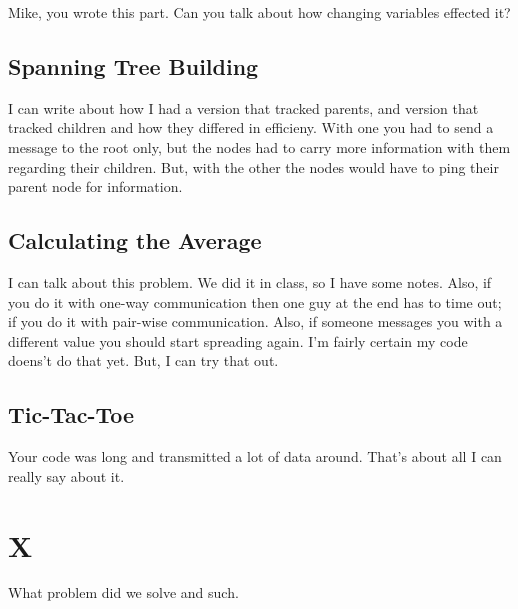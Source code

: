 \documentclass[11pt,twocolumn]{article}
\begin{document}
Mike, you wrote this part.  Can you talk about how changing variables effected
it?

\subsection{Spanning Tree Building}

I can write about how I had a version that tracked parents, and version that 
tracked children and how they differed in efficieny.  With one you had to
send a message to the root only, but the nodes had to carry more information
with them regarding their children.  But, with the other the nodes would have
to ping their parent node for information.

\subsection{Calculating the Average}

I can talk about this problem.  We did it in class, so I have some notes.  Also,
if you do it with one-way communication then one guy at the end has to time out;
if you do it with pair-wise communication.  Also, if someone messages you with
 a different value you should start spreading again.  I'm fairly certain my 
code doens't do that yet.  But, I can try that out.

\subsection{Tic-Tac-Toe}

Your code was long and transmitted a lot of data around.  That's about all I can
 really say about it.

\section{X}

What problem did we solve and such.
\end{document}
